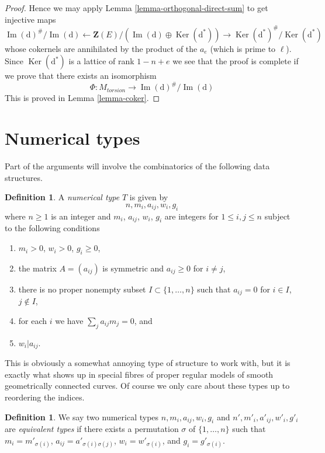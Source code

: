 \documentclass{stacks-project}
\theoremstyle{plain}
\theoremstyle{definition}
\newtheorem{definition}[subsection]{Definition}
\theoremstyle{remark}
\numberwithin{equation}{subsection}
\def\Ker{\mathop{\mathrm{Ker}}}
\def\Im{\mathop{\mathrm{Im}}}
\begin{document}
\begin{proof}
\medskip\noindent
Hence we may apply Lemma \ref{lemma-orthogonal-direct-sum}
to get injective maps
$$
\Im(\text{d})^\#/\Im(\text{d}) \leftarrow
\mathbf{Z}(E)/(\Im(\text{d}) \oplus \Ker(\text{d}^*)) \rightarrow
\Ker(\text{d}^*)^\#/\Ker(\text{d}^*)
$$
whose cokernels are annihilated by the product of the $a_e$
(which is prime to $\ell$). Since $\Ker(\text{d}^*)$ is
a lattice of rank $1 - n + e$ we see that the proof is complete
if we prove that there exists an isomorphism
$$
\Phi : M_{torsion} \longrightarrow \Im(\text{d})^\#/\Im(\text{d})
$$
This is proved in Lemma \ref{lemma-coker}.
\end{proof}









\section{Numerical types}
\label{section-numerical-types}

\noindent
Part of the arguments will involve the combinatorics of the following
data structures.

\begin{definition}
\label{definition-type}
A {\it numerical type} $T$ is given by
$$
n, m_i, a_{ij}, w_i, g_i
$$
where $n \geq 1$ is an integer and $m_i$, $a_{ij}$, $w_i$, $g_i$
are integers for $1 \leq i, j \leq n$ subject to the following conditions
\begin{enumerate}
\item $m_i > 0$, $w_i > 0$, $g_i \geq 0$,
\item the matrix $A = (a_{ij})$ is symmetric and $a_{ij} \geq 0$
for $i \not = j$,
\item there is no proper nonempty subset $I \subset \{1, \ldots, n\}$
such that $a_{ij} = 0$ for $i \in I$, $j \not \in I$,
\item for each $i$ we have $\sum_j a_{ij}m_j = 0$, and
\item $w_i | a_{ij}$.
\end{enumerate}
\end{definition}

\noindent
This is obviously a somewhat annoying type of structure to work with,
but it is exactly what shows up in special fibres of proper regular
models of smooth geometrically connected curves.
Of course we only care about these types up to reordering the indices.

\begin{definition}
\label{definition-type-equivalent}
We say two numerical types $n, m_i, a_{ij}, w_i, g_i$ and
$n', m'_i, a'_{ij}, w'_i, g'_i$ are {\it equivalent types} if
there exists a permutation $\sigma$ of $\{1, \ldots, n\}$
such that $m_i = m'_{\sigma(i)}$, $a_{ij} = a'_{\sigma(i)\sigma(j)}$,
$w_i = w'_{\sigma(i)}$, and $g_i = g'_{\sigma(i)}$.
\end{definition}
\end{document}
